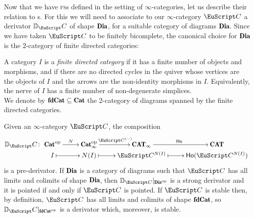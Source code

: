 Now that we have \textsc{fs}s defined in the setting of $\infty$-categories, let us describe their relation to {\dfs}s. For this we will need to associate to our $\infty$-category $\iC$ a derivator $\D_\iC$ of shape $\Dia$, for a suitable category of diagrams $\Dia$. Since we have taken $\iC$ to be finitely bicomplete, the canonical choice for $\Dia$ is the $2$-category of finite directed categories:
\begin{definition}
A category $I$ is a \emph{finite directed category} if it has a finite number of objects and morphisms, and if there are no directed cycles in the quiver whose vertices are the objects of $I$ and the arrows are the non-identity morphisms in $I$. Equivalently, the nerve of $I$  has a finite number of non-degenerate simplices.\\
We denote by $\fincat\subseteq \cat$ the $2$-category of diagrams spanned by the finite directed categories.
\end{definition}
\begin{proposition}
\cite[Remark \textbf{5.3.10}]{riehl2017kan}
Given an $\infty$-category $\iC$, the composition
$$\D_\iC\colon\xymatrix@R=0pt{
\cat^\opp\ar[r]^{N}&\cat_{\infty}^\opp\ar[r]^{\iC^{(-)}}&\Cat_{\infty}\ar[r]^{\ho}&\Cat\\
I\ar@{|->}[r]&N(I)\ar@{|->}[r]&\iC^{N(I)}\ar@{|->}[r]&\ho(\iC^{N(I)})}$$
is a pre-derivator. If $\Dia$ is a category of diagrams such that $\iC$ has all limits and colimits of shape $\Dia$, then $\D_{\iC}\restriction_{\Dia^\opp}$  is a strong derivator and it is pointed if and only if $\iC$ is pointed. If $\iC$ is stable then, by definition, $\iC$ has all limits and colimits of shape $\fincat$, so $\D_\iC\restriction_{\fincat^\opp}$ is a derivator which, moreover, is stable. 
\end{proposition}

